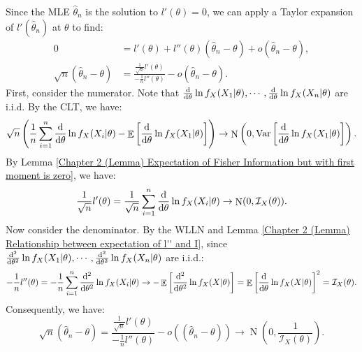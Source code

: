 \documentclass{huhtakm-template-book-v2}
\DeclareMathOperator{\E}{\mathbb{E}}
\DeclareMathOperator{\Var}{Var}
\DeclareMathOperator{\N}{N}
\begin{document}
    \begin{proofing}
        Since the MLE $\hat{\theta}_{n}$ is the solution to $l'(\theta) = 0$, we can apply a Taylor expansion of $l'(\hat{\theta}_{n})$ at $\theta$ to find:
        \begin{align*}
            0 &= l'(\theta) + l''(\theta)(\hat{\theta}_{n} - \theta) + o(\hat{\theta}_{n} - \theta),\\
            \sqrt{n}(\hat{\theta}_{n} - \theta) &= \frac{\frac{1}{\sqrt{n}}l'(\theta)}{-\frac{1}{n}l''(\theta)} - o(\hat{\theta}_{n} - \theta).
        \end{align*}
        First, consider the numerator. Note that $\odv*{}{\theta} \ln{f_{X}(X_{1} | \theta)}, \cdots, \odv*{}{\theta} \ln{f_{X}(X_{n} | \theta)}$ are i.i.d. By the CLT, we have:
        \begin{equation*}
            \sqrt{n}\left(\frac{1}{n} \sum_{i=1}^{n} \odv*{}{\theta} \ln{f_{X}(X_{i} | \theta)} - \E\left[\odv*{}{\theta} \ln{f_{X}(X_{1} | \theta)}\right]\right) \to \N\left(0, \Var\left[\odv*{}{\theta} \ln{f_{X}(X_{1} | \theta)}\right]\right).
        \end{equation*}
        By Lemma \ref{Chapter 2 (Lemma) Expectation of Fisher Information but with first moment is zero}, we have:
        \begin{equation*}
            \frac{1}{\sqrt{n}}l'(\theta) = \frac{1}{\sqrt{n}} \sum_{i=1}^{n} \odv*{}{\theta} \ln{f_{X}(X_{i} | \theta)} \to \N(0, \mathcal{I}_{X}(\theta)).
        \end{equation*}
        Now consider the denominator. By the WLLN and Lemma \ref{Chapter 2 (Lemma) Relationship between expectation of l'' and I}, since $\odv*[order={2}]{}{\theta} \ln{f_{X}(X_{1} | \theta)}, \cdots, \odv*[order={2}]{}{\theta} \ln{f_{X}(X_{n} | \theta)}$ are i.i.d.:
        \begin{equation*}
            -\frac{1}{n}l''(\theta) = -\frac{1}{n} \sum_{i=1}^{n} \odv*[order={2}]{}{\theta} \ln{f_{X}(X_{i} | \theta)} \to -\E\left[\odv*[order={2}]{}{\theta} \ln{f_{X}(X | \theta)}\right] = \E\left[\odv*{}{\theta} \ln{f_{X}(X | \theta)}\right]^{2} = \mathcal{I}_{X}(\theta).
        \end{equation*}
        Consequently, we have:
        \begin{equation*}
            \sqrt{n}(\hat{\theta}_{n} - \theta) = \frac{\frac{1}{\sqrt{n}}l'(\theta)}{-\frac{1}{n}l''(\theta)} - o((\hat{\theta}_{n} - \theta)) \to \N\left(0, \frac{1}{\mathcal{I}_{X}(\theta)}\right).
        \end{equation*}
    \end{proofing}
\end{document}
